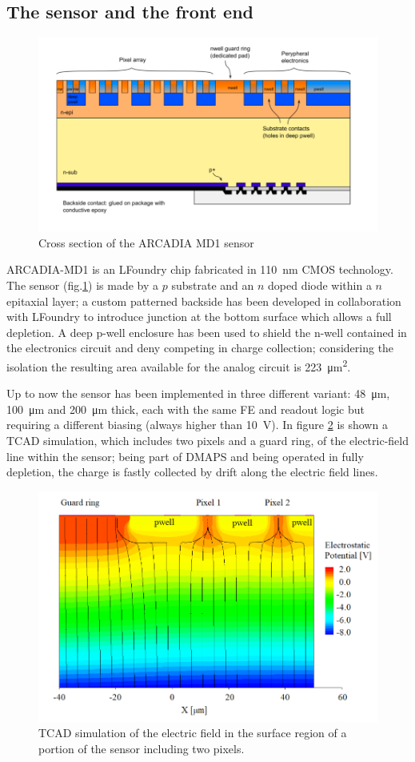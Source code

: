 \subsection{The sensor and the front end}
    \begin{figure}[h!]
        \centering
        \includegraphics[width=.75\linewidth]{figures/ARCADIA/sensor.png}
        \caption{Cross section of the ARCADIA MD1 sensor}
        \label{fig:ARCADIA_substrate}
    \end{figure}
    ARCADIA-MD1 is an LFoundry chip fabricated in \SI{110}{nm} CMOS technology.%
    The sensor (fig.\ref{fig:ARCADIA_substrate}) is made by a $p$ substrate and an $n$ doped diode within a $n$ epitaxial layer; a custom patterned backside has been developed in collaboration with LFoundry to introduce junction at the bottom surface which allows a full depletion. 
    A deep p-well enclosure has been used to shield the n-well contained in the electronics circuit and deny competing in charge collection; considering the isolation the resulting area available for the analog circuit is \SI{223}{\um\squared}.

    Up to now the sensor has been implemented in three different variant: \SI{48}{\um}, \SI{100}{\um} and \SI{200}{\um} thick, each with the same FE and readout logic but requiring a different biasing (always higher than \SI{10}{V}). 
    In figure \ref{fig:ARCADIA_E} is shown a TCAD simulation, which includes two pixels and a guard ring, of the electric-field line within the sensor; being part of DMAPS and being operated in fully depletion, the charge is fastly collected by drift along the electric field lines. 
    \begin{figure}[h!]
        \centering
        \includegraphics[width=.65\linewidth]{figures/ARCADIA/ARCADIA_TCAD.png}
        \caption{TCAD simulation of the electric field in the surface region of a portion of the sensor including two pixels.}
        \label{fig:ARCADIA_E}
    \end{figure}

